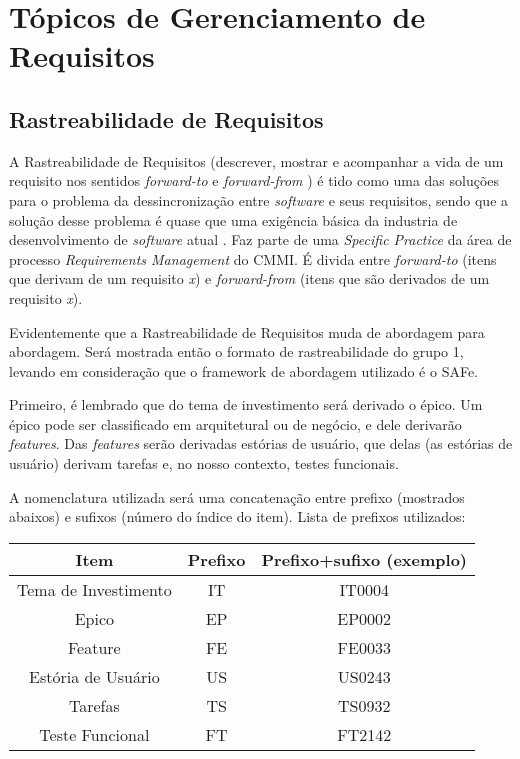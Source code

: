 
\chapter[Tópicos de Gerenciamento de Requisitos]{Tópicos de Gerenciamento de Requisitos}
\section{Rastreabilidade de Requisitos}
A Rastreabilidade de Requisitos (descrever, mostrar e acompanhar a vida de um requisito nos sentidos \emph{forward-to} e \emph{forward-from} \cite{garcia001}) é tido como uma das soluções para o problema da dessincronização entre \emph{software} e seus requisitos, sendo que a solução desse problema é quase que uma exigência básica da industria de desenvolvimento de \emph{software} atual \cite{leal001}. Faz parte de uma \emph{Specific Practice} da área de processo \emph{Requirements Management} do CMMI. É divida entre \emph{forward-to} (itens que derivam de um requisito \emph{x}) e \emph{forward-from} (itens que são derivados de um requisito \emph{x}).

Evidentemente que a Rastreabilidade de Requisitos muda de abordagem para abordagem. Será mostrada então o formato de rastreabilidade do grupo 1, levando em consideração que o framework de abordagem utilizado é o SAFe.

Primeiro, é lembrado que do tema de investimento será derivado o épico. Um épico pode ser classificado em arquitetural ou de negócio, e dele derivarão \emph{features}. Das \emph{features} serão derivadas estórias de usuário, que delas (as estórias de usuário) derivam tarefas e, no nosso contexto, testes funcionais.

A nomenclatura utilizada será uma concatenação entre prefixo (mostrados abaixos) e sufixos (número do índice do item). Lista de prefixos utilizados:

\begin{tabular}{c | c | c}
  \hline
  Item & Prefixo & Prefixo+sufixo (exemplo)\\ \hline
  Tema de Investimento & IT & IT0004 \\
  Epico & EP & EP0002 \\
  Feature & FE & FE0033 \\
  Estória de Usuário & US & US0243 \\
  Tarefas & TS & TS0932 \\
  Teste Funcional & FT & FT2142 \\
  \hline
\end{tabular}


